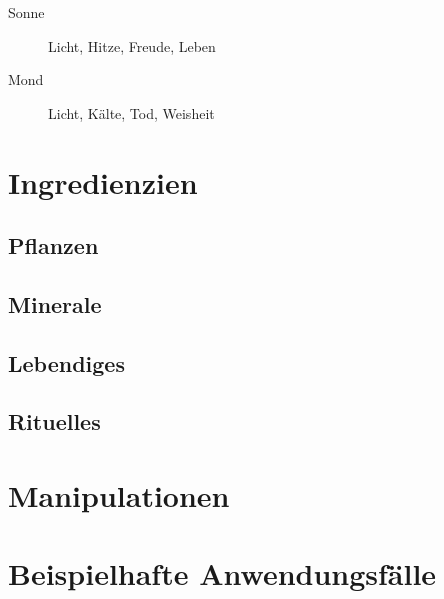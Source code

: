 \documentclass[a4paper,12pt,oneside]{book}
\begin{document}
\begin{description}

\item[Sonne] Licht, Hitze, Freude, Leben
\item[Mond] Licht, Kälte, Tod, Weisheit

\end{description}


\part{Ingredienzien}
\chapter{Pflanzen}

\chapter{Minerale}

\chapter{Lebendiges}

\chapter{Rituelles}



\part{Manipulationen}

\part{Beispielhafte Anwendungsfälle}
\end{document}
